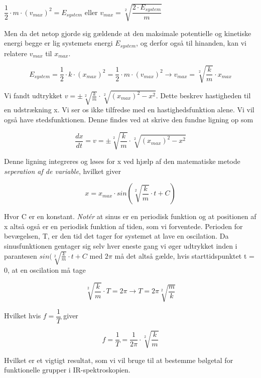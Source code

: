 \bigskip
\begin{center}
$\dfrac{1}{2} \cdot m \cdot (v_{max})^2 = E_{system}$ eller $v_{max} = \sqrt[2]{\dfrac{2 \cdot E_{system}}{m}}$
\end{center}
\bigskip

Men da det netop gjorde sig gældende at den maksimale potentielle og kinetiske energi begge er lig systemets energi $E_{system}$, og derfor også til hinanden, kan vi relatere $v_{max}$ til $x_{max}$.

\begin{center}
\begin{equation}
E_{system} = \dfrac{1}{2} \cdot k \cdot (x_{max})^2 = \dfrac{1}{2} \cdot m \cdot (v_{max})^2 \rightarrow v_{max} = \sqrt[2]{\dfrac{k}{m}} \cdot x_{max}
\end{equation}
\end{center}

Vi fandt udtrykket $v = \pm \sqrt[2]{\frac{k}{m}} \cdot \sqrt[2]{(x_{max})^2-x^2}$. Dette beskrev hastigheden til en udstrækning x. Vi ser os ikke tilfredse med en hastighedsfunktion alene. Vi vil også have stedsfunktionen. Denne findes ved at skrive den fundne ligning op som 

\begin{center}
\begin{equation}
\dfrac{dx}{dt} = v = \pm \sqrt[2]{\dfrac{k}{m}} \cdot \sqrt[2]{(x_{max})^2-x^2}
\end{equation}
\end{center}

Denne ligning integreres og løses for x ved hjælp af den matematiske metode \emph{seperation af de variable}, hvilket giver

\begin{center}
\begin{equation}
x = x_{max} \cdot sin(\sqrt[2]{\dfrac{k}{m}} \cdot t + C)
\end{equation}
\end{center}
\bigskip
Hvor C er en konstant. \emph{Notér} at sinus er en periodisk funktion og at positionen af x altså også er en periodisk funktion af tiden, som vi forventede. Perioden for bevægelsen, T, er den tid det tager for systemet at lave en oscilation. Da sinusfunktionen gentager sig selv hver eneste gang vi øger udtrykket inden i parantesen $sin(\sqrt[2]{\frac{k}{m}} \cdot t + C$ med $2 \pi$ må det altså gælde, hvis starttidspunktet t = 0, at en oscilation må tage

\begin{center}
\begin{equation}
\sqrt[2]{\dfrac{k}{m}} \cdot T = 2 \pi \rightarrow T = 2 \pi \sqrt[2]{\dfrac{m}{k}}
\end{equation}
\end{center}

Hvilket hvis $f = \dfrac{1}{T}$ giver

\begin{center}
\begin{equation}
f = \dfrac{1}{T} = \dfrac{1}{2 \pi} \cdot \sqrt[2]{\dfrac{k}{m}}
\end{equation}
\end{center}

Hvilket er et vigtigt resultat, som vi vil bruge til at bestemme bølgetal for funktionelle grupper i IR-spektroskopien. 
